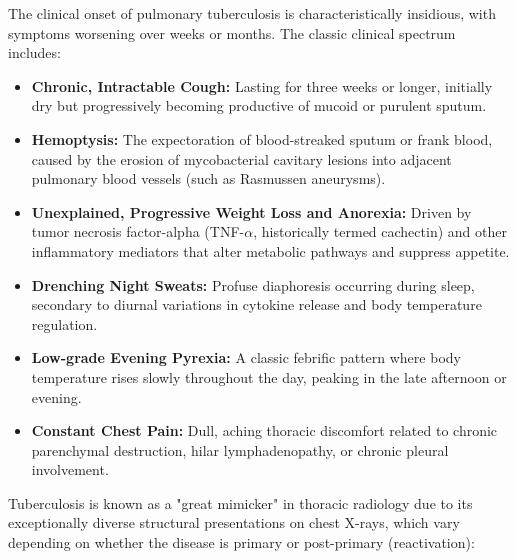 The clinical onset of pulmonary tuberculosis is characteristically insidious, with symptoms worsening over weeks or months. The classic clinical spectrum includes:

\begin{itemize}
	\item \textbf{Chronic, Intractable Cough:} Lasting for three weeks or longer, initially dry but progressively becoming productive of mucoid or purulent sputum.
	\item \textbf{Hemoptysis:} The expectoration of blood-streaked sputum or frank blood, caused by the erosion of mycobacterial cavitary lesions into adjacent pulmonary blood vessels (such as Rasmussen aneurysms).
	\item \textbf{Unexplained, Progressive Weight Loss and Anorexia:} Driven by tumor necrosis factor-alpha (TNF-$\alpha$, historically termed cachectin) and other inflammatory mediators that alter metabolic pathways and suppress appetite.
	\item \textbf{Drenching Night Sweats:} Profuse diaphoresis occurring during sleep, secondary to diurnal variations in cytokine release and body temperature regulation.
	\item \textbf{Low-grade Evening Pyrexia:} A classic febrific pattern where body temperature rises slowly throughout the day, peaking in the late afternoon or evening.
	\item \textbf{Constant Chest Pain:} Dull, aching thoracic discomfort related to chronic parenchymal destruction, hilar lymphadenopathy, or chronic pleural involvement.
\end{itemize}

Tuberculosis is known as a "great mimicker" in thoracic radiology due to its exceptionally diverse structural presentations on chest X-rays, which vary depending on whether the disease is primary or post-primary (reactivation):

